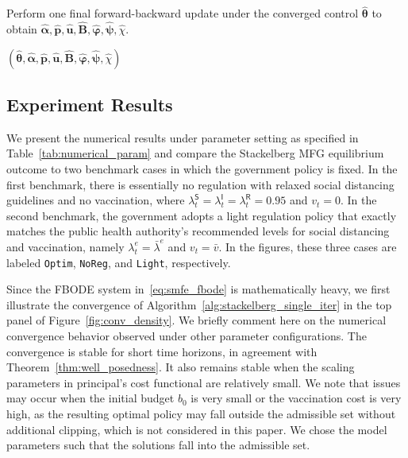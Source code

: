 \documentclass[letterpaper, 10 pt, conference]{ieeeconf}  %
\def\sS{\mathsf{S}}
\def\sI{\mathsf{I}}
\def\sR{\mathsf{R}}
\newcommand\bp{\boldsymbol{p}}
\newcommand\bu{\boldsymbol{u}}
\newcommand\btheta{\boldsymbol{\theta}}
\newcommand\bpsi{\boldsymbol{\psi}}
\newcommand\bvarphi{\boldsymbol{\varphi}}
\begin{document}
{\begin{algorithm}
\begin{algorithmic}[1]
\ENDWHILE

\STATE Perform one final forward-backward update under the converged control $\hat{\btheta}$ to obtain
$\hat{\boldsymbol\alpha},
\hat{\bp},
\hat{\bu},
\hat{\boldsymbol B},
\hat{\bvarphi},
\hat{\bpsi},
\hat{\chi}$.\vskip1mm

\RETURN
$(\hat{\btheta}, \hat{\boldsymbol\alpha},
\hat{\bp},
\hat{\bu},
\hat{\boldsymbol B},
\hat{\bvarphi},
\hat{\bpsi},
\hat{\chi})$
\end{algorithmic}
\end{algorithm}
}

\subsection{Experiment Results}
We present the numerical results under parameter setting as specified in Table~\ref{tab:numerical_param} and compare the Stackelberg MFG equilibrium outcome to two benchmark cases in which the government policy is fixed. In the first benchmark, there is essentially no regulation with relaxed social distancing guidelines and no vaccination, where $\lambda_t^\sS=\lambda_t^\sI=\lambda_t^\sR=0.95$ and $v_t=0$. In the second benchmark, the government adopts a light regulation policy that exactly matches the public health authority's recommended levels for social distancing and vaccination, namely $\lambda_t^e=\bar{\lambda}^e$ and $v_t=\bar v$. In the figures, these three cases are labeled \texttt{Optim}, \texttt{NoReg}, and \texttt{Light}, respectively.

Since the FBODE system in~\eqref{eq:smfe_fbode} is mathematically heavy, we first illustrate the convergence of Algorithm~\ref{alg:stackelberg_single_iter} in the top panel of Figure~\ref{fig:conv_density}. We briefly comment here on the numerical convergence behavior observed under other parameter configurations. The convergence is stable for short time horizons, in agreement with Theorem~\ref{thm:well_posedness}. It also remains stable when the scaling parameters in principal's cost functional are relatively small. We note that issues may occur when the initial budget $b_0$ is very small or the vaccination cost is very high, as the resulting optimal policy may fall outside the admissible set without additional clipping, which is not considered in this paper.
We chose the model parameters such that the solutions fall into the admissible set.
\end{document}
